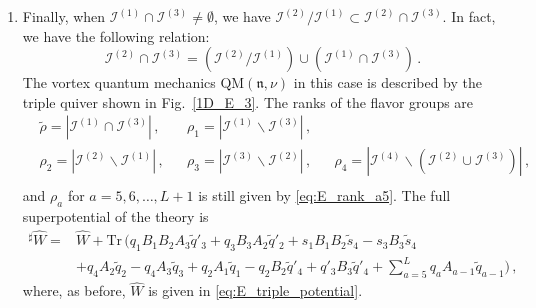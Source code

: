 \documentclass[12pt,a4paper]{article}
\newcommand{\nn}{\mathfrak{n}}
\renewcommand{\(}{\left(}
\renewcommand{\)}{\right)}
\renewcommand{\(}{\left(}
\renewcommand{\)}{\right)}
\begin{document}
\begin{enumerate}
\item Finally, when $\mathcal{I}^{(1)}\cap \mathcal{I}^{(3)}\neq \emptyset$, we have $\mathcal{I}^{(2)}/\mathcal{I}^{(1)}\subset \mathcal{I}^{(2)}\cap \mathcal{I}^{(3)}$. 
In fact, we have the following relation:
\begin{equation}
\mathcal{I}^{(2)}\cap \mathcal{I}^{(3)}=(\mathcal{I}^{(2)}/\mathcal{I}^{(1)})\cup(\mathcal{I}^{(1)}\cap \mathcal{I}^{(3)})\,.
\end{equation}
The vortex quantum mechanics $\textrm{QM}(\nn,\nu)$ in this case is described by the triple quiver shown in Fig.~\ref{1D_E_3}. 
The ranks of the flavor groups are
\begin{equation}
\begin{aligned}
&\tilde{\rho}=|\mathcal{I}^{(1)}\cap\mathcal{I}^{(3)}|\,,
&&\rho_1=|\mathcal{I}^{(1)}\backslash\mathcal{I}^{(3)}|\,,\\
&\rho_2=|\mathcal{I}^{(2)}\backslash \mathcal{I}^{(1)}|\,,
&&\rho_3=|\mathcal{I}^{(3)}\backslash\mathcal{I}^{(2)}|\,,
&&\rho_4=|\mathcal{I}^{(4)}\backslash(\mathcal{I}^{(2)}\cup\mathcal{I}^{(3)})|\,,\\
\end{aligned}
\end{equation}
and $\rho_a$ for $a=5,6,\dots,L+1$ is still given by \eqref{eq:E_rank_a5}. 
The full superpotential of the theory is
\begin{equation}
\begin{aligned}
{}^\sharp \widehat{W}=&\widehat{W}+\mathrm{Tr}\,(q_1B_1B_2A_3\tilde{q}'_3+q_3B_3A_2\tilde{q}'_2+s_1B_1B_2\tilde{s}_4-s_3B_3\tilde{s}_4\\
&+q_4A_2\tilde{q}_2-q_4A_3\tilde{q}_3+q_2A_1\tilde{q}_1-q_2B_2\tilde{q}'_4+q'_3B_3\tilde{q}'_4+\sum_{a=5}^{L}q_aA_{a-1}\tilde{q}_{a-1})\,,
\end{aligned}
\end{equation}
where, as before, $\widehat{W}$ is given in \eqref{eq:E_triple_potential}.
\begin{figure}[h!]
\centering
{}
\end{figure}
\end{enumerate}
\end{document}
